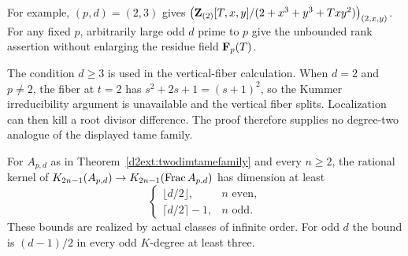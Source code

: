 For example, $(p,d)=(2,3)$ gives
$\bigl(\mathbf Z_{(2)}[T,x,y]/(2+x^3+y^3+Txy^2)\bigr)_{(2,x,y)}$.
For any fixed $p$, arbitrarily large odd $d$ prime to $p$ give
the unbounded rank assertion without enlarging the residue
field $\mathbf F_p(T)$. 

\begin{remark}
The condition $d\ge3$ is used in the vertical-fiber calculation.
When $d=2$ and $p\ne2$, the fiber at $t=2$ has
$s^2+2s+1=(s+1)^2$, so the Kummer irreducibility argument is
unavailable and the vertical fiber splits. Localization can then
kill a root divisor difference. The proof therefore supplies no
degree-two analogue of the displayed tame family.
\end{remark}

\begin{corollary}
\label{d2ext:twodimtameallodd}
For $A_{p,d}$ as in Theorem~\ref{d2ext:twodimtamefamily} and every
$n\ge2$, the rational kernel of
$K_{2n-1}(A_{p,d})\to K_{2n-1}(\operatorname{Frac} A_{p,d})$ has dimension at least
\[
 \begin{cases}
 \lfloor d/2\rfloor,&n\text{ even},\\
 \lceil d/2\rceil-1,&n\text{ odd}.
 \end{cases}
\]
These bounds are realized by actual classes of infinite order.
For odd $d$ the bound is $(d-1)/2$ in every odd $K$-degree at least three.
\end{corollary}

